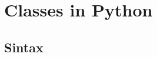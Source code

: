 \documentclass[10pt,compress]{beamer} %
\begin{document}
\section{Classes in Python}
   \subsection{Sintax}


\end{document}
